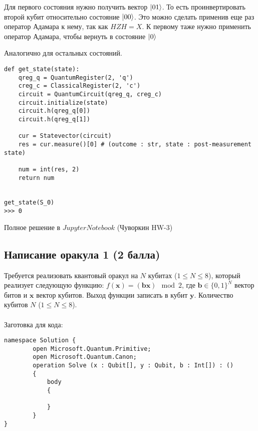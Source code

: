\documentclass[a4paper]{article}
\begin{document}
Для первого состояния нужно получить вектор $\Ket{01}$. То есть проинвертировать второй кубит относительно состояние $ \Ket{00} $. 
Это можно сделать применив еще раз оператор Адамара к нему, так как $HZH = X$. К первому таже нужно применить оператор Адамара, чтобы вернуть в состояние $\Ket{0}$

Аналогично для остальных состояний.


\begin{verbatim}
def get_state(state):
    qreg_q = QuantumRegister(2, 'q')
    creg_c = ClassicalRegister(2, 'c')
    circuit = QuantumCircuit(qreg_q, creg_c)
    circuit.initialize(state)
    circuit.h(qreg_q[0])
    circuit.h(qreg_q[1])

    cur = Statevector(circuit)
    res = cur.measure()[0] # (outcome : str, state : post-measurement state) 

    num = int(res, 2)
    return num


get_state(S_0)
>>>	0

\end{verbatim}

Полное решение в $Jupyter Notebook$ (Чуворкин HW-3)


\subsection{Написание оракула 1 (2 балла)}

Требуется реализовать квантовый оракул на $N$ кубитах ($1 \le N \le 8$), который реализует следующую функцию: $f(\pmb{x}) = (\pmb{b}\pmb{x}) \mod 2$, где  $\pmb{b} \in \{0,1\}^N$ вектор битов и  $\pmb{x}$ вектор кубитов. Выход функции записать в кубит $\pmb{y}$. Количество кубитов $N$ ($1 \le N \le 8$). 
\\\\
Заготовка для кода:
\begin{lstlisting}
namespace Solution {
        open Microsoft.Quantum.Primitive;
        open Microsoft.Quantum.Canon;
        operation Solve (x : Qubit[], y : Qubit, b : Int[]) : ()
        {
            body
            {

            }
        }
}
\end{lstlisting}
\end{document}
